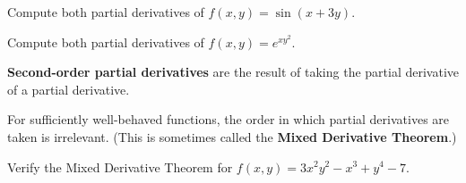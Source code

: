 \documentclass[letterpaper, twoside, 12pt]{book}
\begin{document}
          \begin{solution}

          \end{solution}

          \begin{problem}
            Compute both partial derivatives of $f(x,y)=\sin(x+3y)$.
          \end{problem}

          \begin{solution}

          \end{solution}

          \begin{problem}
            Compute both partial derivatives of $f(x,y)=e^{xy^2}$.
          \end{problem}

          \begin{solution}

          \end{solution}

\begin{definition}
  \textbf{Second-order partial derivatives} are the result of taking the
  partial derivative of a partial derivative.
\end{definition}

\begin{theorem}
  For sufficiently well-behaved functions, the order in which partial
  derivatives are taken is irrelevant. (This is sometimes called the
  \textbf{Mixed Derivative Theorem}.)
\end{theorem}

          \begin{problem}
            Verify the Mixed Derivative Theorem for
            $f(x,y)=3x^2y^2-x^3+y^4-7$.
          \end{problem}

          \begin{solution}

          \end{solution}
\end{document}
